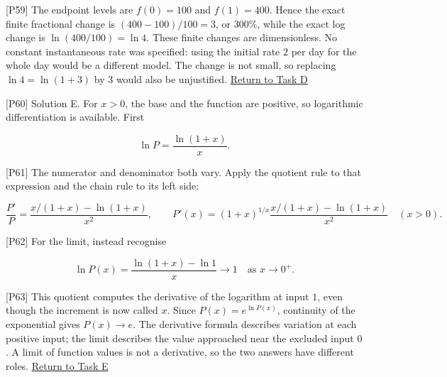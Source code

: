 \documentclass[
  11pt,
]{article}
\providecommand{\gt}{>}
\begin{document}
{[}P59{]} The endpoint levels are \(f(0)=100\) and \(f(1)=400\). Hence
the exact finite fractional change is \((400-100)/100=3\), or \(300\%\),
while the exact log change is \(\ln(400/100)=\ln4\). These finite
changes are dimensionless. No constant instantaneous rate was specified:
using the initial rate \(2\) per day for the whole day would be a
different model. The change is not small, so replacing \(\ln4=\ln(1+3)\)
by \(3\) would also be unjustified. \protect\hyperlink{task-d}{Return to
Task D}

{[}P60{]} Solution E. For \(x\gt0\), the base and the function are
positive, so logarithmic differentiation is available. First

\[
\ln P=\frac{\ln(1+x)}x.
\]

{[}P61{]} The numerator and denominator both vary. Apply the quotient
rule to that expression and the chain rule to its left side:

\[
\frac{P'}P=
\frac{x/(1+x)-\ln(1+x)}{x^2},
\qquad
P'(x)=(1+x)^{1/x}\frac{x/(1+x)-\ln(1+x)}{x^2}\quad(x\gt0).
\]

{[}P62{]} For the limit, instead recognise

\[
\ln P(x)=\frac{\ln(1+x)-\ln1}{x}\longrightarrow1
\quad\text{as }x\to0^+.
\]

{[}P63{]} This quotient computes the derivative of the logarithm at
input \(1\), even though the increment is now called \(x\). Since
\(P(x)=e^{\ln P(x)}\), continuity of the exponential gives
\(P(x)\to e\). The derivative formula describes variation at each
positive input; the limit describes the value approached near the
excluded input \(0\). A limit of function values is not a derivative, so
the two answers have different roles. \protect\hyperlink{task-e}{Return
to Task E}
\end{document}
